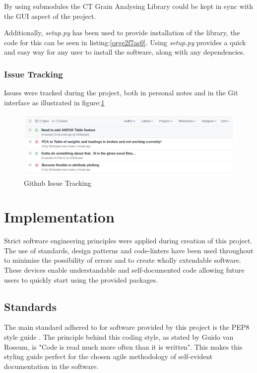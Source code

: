 \documentclass[11pt]{report}
\begin{document}
By using submodules the CT Grain Analysing Library could be kept in sync with the GUI aspect of the project.

Additionally, \emph{setup.py} has been used to provide installation of the library, the code for this can be seen in listing:\ref{orge2f7ac0}. Using \emph{setup.py} provides a quick and easy way for any user to install the software, along with any dependencies.

\subsubsection{Issue Tracking}
\label{sec:org8ba446f}
Issues were tracked during the project, both in personal notes and in the Git interface as illustrated in figure:\ref{fig:orga348ab6}
\begin{figure}[htbp]
\centering
\includegraphics[width=12cm]{./images/github.png}
\caption{\label{fig:orga348ab6}
Github Issue Tracking}
\end{figure}

\section{Implementation}
\label{sec:orgc7b64fb}
Strict software engineering principles were applied during creation of this project. The use of standards, design patterns and code-linters have been used throughout to minimise the possibility of errors and to create wholly extendable software. These devices enable understandable and self-documented code allowing future users to quickly start using the provided packages.
\subsection{Standards}
\label{sec:orgdd3468a}
The main standard adhered to for software provided by this project is the PEP8 style guide \cite{VanRossum}. The principle behind this coding style, as stated by Guido van Rossum, is "Code is read much more often than it is written". This makes this styling guide perfect for the chosen agile methodology of self-evident documentation in the software.
\end{document}
